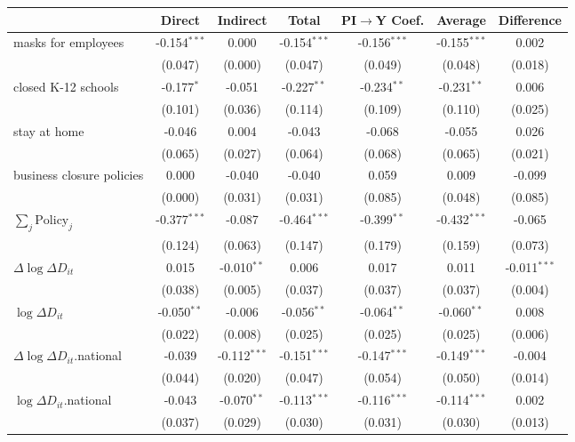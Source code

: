 
\begin{tabular}{lccccc|>{}c}
\toprule
  & Direct & Indirect & Total & PI$\to$Y Coef. & Average & Difference\\
\midrule
masks for employees & -0.154$^{***}$ & 0.000 & -0.154$^{***}$ & -0.156$^{***}$ & -0.155$^{***}$ & 0.002\\
 & (0.047) & (0.000) & (0.047) & (0.049) & (0.048) & (0.018)\\
closed K-12 schools & -0.177$^{*}$ & -0.051 & -0.227$^{**}$ & -0.234$^{**}$ & -0.231$^{**}$ & 0.006\\
 & (0.101) & (0.036) & (0.114) & (0.109) & (0.110) & (0.025)\\
stay at home & -0.046 & 0.004 & -0.043 & -0.068 & -0.055 & 0.026\\
 & (0.065) & (0.027) & (0.064) & (0.068) & (0.065) & (0.021)\\
business closure policies & 0.000 & -0.040 & -0.040 & 0.059 & 0.009 & -0.099\\
 & (0.000) & (0.031) & (0.031) & (0.085) & (0.048) & (0.085)\\
$\sum_j \mathrm{Policy}_j$ & -0.377$^{***}$ & -0.087 & -0.464$^{***}$ & -0.399$^{**}$ & -0.432$^{***}$ & -0.065\\
 & (0.124) & (0.063) & (0.147) & (0.179) & (0.159) & (0.073)\\
$\Delta \log \Delta D_{it}$ & 0.015 & -0.010$^{**}$ & 0.006 & 0.017 & 0.011 & -0.011$^{***}$\\
 & (0.038) & (0.005) & (0.037) & (0.037) & (0.037) & (0.004)\\
$\log \Delta D_{it}$ & -0.050$^{**}$ & -0.006 & -0.056$^{**}$ & -0.064$^{**}$ & -0.060$^{**}$ & 0.008\\
 & (0.022) & (0.008) & (0.025) & (0.025) & (0.025) & (0.006)\\
$\Delta \log \Delta D_{it}$.national & -0.039 & -0.112$^{***}$ & -0.151$^{***}$ & -0.147$^{***}$ & -0.149$^{***}$ & -0.004\\
 & (0.044) & (0.020) & (0.047) & (0.054) & (0.050) & (0.014)\\
$\log \Delta D_{it}$.national & -0.043 & -0.070$^{**}$ & -0.113$^{***}$ & -0.116$^{***}$ & -0.114$^{***}$ & 0.002\\
 & (0.037) & (0.029) & (0.030) & (0.031) & (0.030) & (0.013)\\
\bottomrule
\end{tabular}